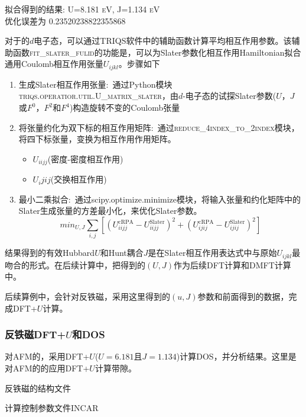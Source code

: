 拟合得到的结果: \textsc{U=8.181 eV, J=1.134 eV\\优化误差为 0.23520238822355868}

对于的$d$电子态，可以通过\textrm{TRIQS}软件中的辅助函数计算平均相互作用参数。该辅助函数\textsc{fit\_slater\_fulid}的功能是，可以为\textrm{Slater}参数化相互作用\textrm{Hamiltonian}拟合通用\textrm{Coulomb}相互作用张量$U_{ijkl}$。步骤如下
\begin{enumerate}
	\item 生成\textrm{Slater}相互作用张量:~通过\textrm{Python}模块\textsc{triqs.operatior.util.U\_matrix\_slater}，由$d$-电子态的试探\textrm{Slater}参数($U$，$J$或$F^0$，$F^2$和$F^4$)构造旋转不变的\textrm{Coulomb}张量
	\item 将张量约化为双下标的相互作用矩阵:~通过\textsc{reduce\_4index\_to\_2index}模块，将四下标张量，变换为相互作用作用矩阵。
		\begin{itemize}
			\item $U_{iijj}$(密度-密度相互作用)
			\item $U_ijij$(交换相互作用)
		\end{itemize}
	\item 最小二乘拟合:~通过\textrm{scipy.optimize.minimize}模块，将输入张量和约化矩阵中的\textrm{Slater}生成张量的方差最小化，来优化\textrm{Slater}参数。
		\begin{displaymath}
			min_{U,J}\sum_{i,j}\left[ (U_{iijj}^{\mathrm{cRPA}}-U_{iijj}^{\mathrm{Slater}})^2+ (U_{ijij}^{\mathrm{cRPA}}-U_{ijij}^{\mathrm{Slater}})^2\right]
		\end{displaymath}
\end{enumerate}
结果得到的有效\textrm{Hubbard}$U$和\textrm{Hunt}耦合$J$是在\textrm{Slater}相互作用表达式中与原始$U_{ijkl}$最吻合的形式。在后续计算中，把得到的$(U,J)$作为后续\textrm{DFT}计算和\textrm{DMFT}计算中。

后续算例中，会针对反铁磁，采用这里得到的$(u,J)$参数和前面得到的数据，完成\textrm{DFT+}$U$计算。

\subsubsection{反铁磁\rm{DFT+}$U$和\textrm{DOS}}
对\textrm{AFM}的，采用\textrm{DFT+}$U$($U=6.181$且$J=1.134$)计算\textrm{DOS}，并分析结果。这里是对\textrm{AFM}的的应用\textrm{DFT+}$U$计算带隙。

反铁磁的结构文件

计算控制参数文件\textrm{INCAR}

